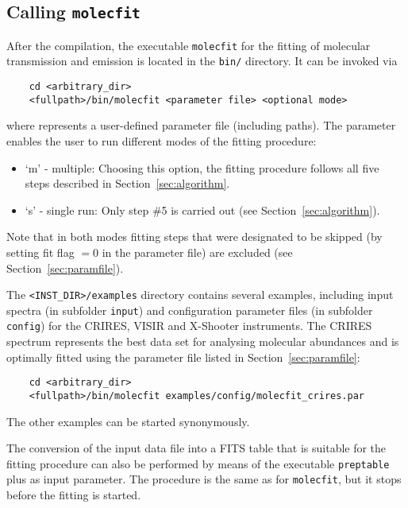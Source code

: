 \subsection{Calling {\tt molecfit}}\label{sec:calling}
After the compilation, the executable {\tt molecfit} for the fitting of
molecular transmission and emission is located in the {\tt bin/} directory. It
can be invoked via
\begin{verbatim}
    cd <arbitrary_dir>
    <fullpath>/bin/molecfit <parameter file> <optional mode>
\end{verbatim}
where {\tt <parameter file>} represents a user-defined parameter file
(including paths). The {\tt <optional mode>} parameter enables the user to run
different modes of the fitting procedure:
\begin{itemize}
    \item `m' - multiple: Choosing this option, the fitting procedure follows
          all five steps described in Section~\ref{sec:algorithm}.
    \item `s' - single run: Only step \#5 is carried out (see
          Section~\ref{sec:algorithm}).
\end{itemize}
Note that in both modes fitting steps that were designated to be skipped (by
setting fit flag $= 0$ in the parameter file) are excluded (see
Section~\ref{sec:paramfile}).

The {\tt <INST\_DIR>/examples} directory contains several examples,
including input spectra (in subfolder {\tt input}) and configuration parameter
files (in subfolder {\tt config}) for the CRIRES, VISIR and X-Shooter
instruments. The CRIRES spectrum represents the best data set for analysing
molecular abundances and is optimally fitted using the parameter file listed
in Section~\ref{sec:paramfile}:
\begin{verbatim}
    cd <arbitrary_dir>
    <fullpath>/bin/molecfit examples/config/molecfit_crires.par
\end{verbatim}
The other examples can be started synonymously.

The conversion of the input data file into a FITS table that is suitable
for the fitting procedure can also be performed by means of the executable
{\tt preptable} plus {\tt <parameter file>} as input parameter. The procedure
is the same as for {\tt molecfit}, but it stops before the fitting is started.

